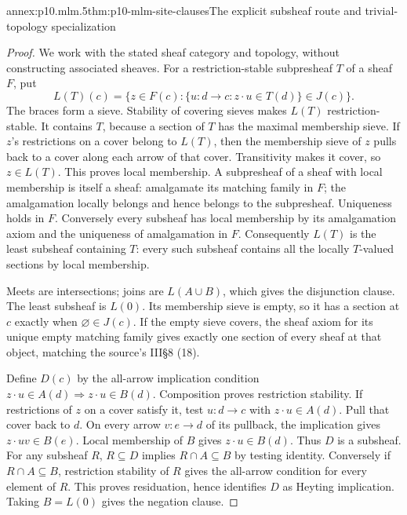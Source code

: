 \begin{annexitem}{annex:p10.mlm.5}{thm:p10-mlm-site-clauses}{The explicit subsheaf route and trivial-topology specialization}
\begin{proof}
We work with the stated sheaf category and topology, without constructing
associated sheaves. For a restriction-stable subpresheaf \(T\) of a sheaf
\(F\), put
\[
 L(T)(c)=\{z\in F(c):\{u:d\to c:z\cdot u\in T(d)\}\in J(c)\}.
\]
The braces form a sieve. Stability of covering sieves makes \(L(T)\)
restriction-stable. It contains \(T\), because a section of \(T\) has the
maximal membership sieve. If \(z\)'s restrictions on a cover belong to
\(L(T)\), then the membership sieve of \(z\) pulls back to a cover along
each arrow of that cover. Transitivity makes it cover, so \(z\in L(T)\).
This proves local membership. A subpresheaf of a sheaf with local membership
is itself a sheaf: amalgamate its matching family in \(F\); the amalgamation
locally belongs and hence belongs to the subpresheaf. Uniqueness holds in
\(F\). Conversely every subsheaf has local membership by its amalgamation
axiom and the uniqueness of amalgamation in \(F\).
Consequently \(L(T)\) is the least subsheaf containing \(T\): every such
subsheaf contains all the locally \(T\)-valued sections by local membership.

Meets are intersections; joins are \(L(A\cup B)\), which gives the disjunction
clause. The least subsheaf is \(L(0)\). Its membership sieve is empty, so
it has a section at \(c\) exactly when \(\varnothing\in J(c)\).
If the empty sieve covers, the sheaf axiom for its unique empty matching
family gives exactly one section of every sheaf at that object, matching
the source's III\S8 (18).

Define \(D(c)\) by the all-arrow implication condition
\(z\cdot u\in A(d)\Rightarrow z\cdot u\in B(d)\).
Composition proves restriction stability. If restrictions of \(z\) on a
cover satisfy it, test \(u:d\to c\) with \(z\cdot u\in A(d)\). Pull that
cover back to \(d\). On every arrow \(v:e\to d\) of its pullback, the
implication gives \(z\cdot uv\in B(e)\). Local membership of \(B\) gives
\(z\cdot u\in B(d)\). Thus \(D\) is a subsheaf.
For any subsheaf \(R\), \(R\subseteq D\) implies \(R\cap A\subseteq B\)
by testing identity. Conversely if \(R\cap A\subseteq B\), restriction
stability of \(R\) gives the all-arrow condition for every element of \(R\).
This proves residuation, hence identifies \(D\) as Heyting implication.
Taking \(B=L(0)\) gives the negation clause.


\end{proof}
\end{annexitem}
